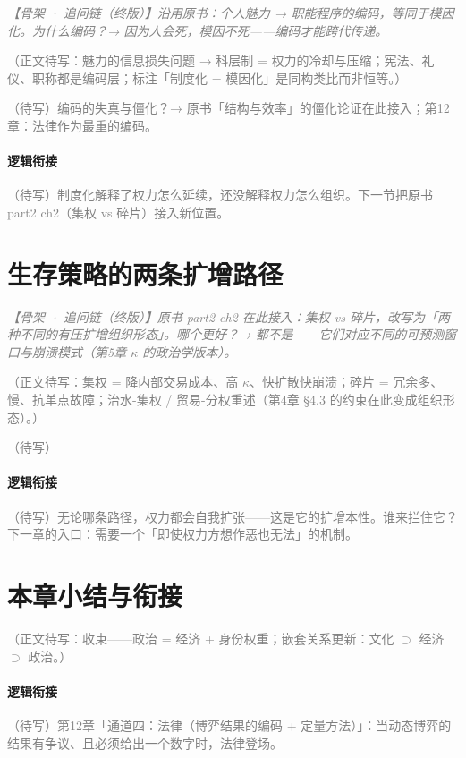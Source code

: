 \documentclass[../../main2.tex]{subfiles}
\begin{document}
	\textcolor{gray}{\textit{【骨架 · 追问链（终版）】沿用原书：个人魅力 → 职能程序的编码，等同于模因化。为什么编码？→ 因为人会死，模因不死——编码才能跨代传递。}}

	\textcolor{gray}{（正文待写：魅力的信息损失问题 → 科层制 = 权力的冷却与压缩；宪法、礼仪、职称都是编码层；\lowfreq 标注「制度化 = 模因化」是同构类比而非恒等。）}

	\begin{reader_anticipation}
		\item \textcolor{gray}{（待写）编码的失真与僵化？→ 原书「结构与效率」的僵化论证在此接入；第12章：法律作为最重的编码。}
	\end{reader_anticipation}

	\paragraph*{逻辑衔接}
	\textcolor{gray}{（待写）制度化解释了权力怎么延续，还没解释权力怎么组织。下一节把原书 part2 ch2（集权 vs 碎片）接入新位置。}

	\section{生存策略的两条扩增路径}
	\label{sec:pol-two-paths}

	\textcolor{gray}{\textit{【骨架 · 追问链（终版）】原书 part2 ch2 在此接入：集权 vs 碎片，改写为「两种不同的有压扩增组织形态」。哪个更好？→ 都不是——它们对应不同的可预测窗口与崩溃模式（第5章 $\kappa$ 的政治学版本）。}}

	\textcolor{gray}{（正文待写：集权 = 降内部交易成本、高 $\kappa$、快扩散快崩溃；碎片 = 冗余多、慢、抗单点故障；治水-集权 / 贸易-分权重述（第4章 §4.3 的约束在此变成组织形态）。）}

	\begin{readingnote}
		\textcolor{gray}{（待写）}
	\end{readingnote}

	\paragraph*{逻辑衔接}
	\textcolor{gray}{（待写）无论哪条路径，权力都会自我扩张——这是它的扩增本性。谁来拦住它？下一章的入口：需要一个「即使权力方想作恶也无法」的机制。}

	\section{本章小结与衔接}
	\label{sec:pol-summary}

	\textcolor{gray}{（正文待写：收束——政治 = 经济 + 身份权重；嵌套关系更新：文化 $\supset$ 经济 $\supset$ 政治。）}

	\paragraph*{逻辑衔接}
	\textcolor{gray}{（待写）第12章「通道四：法律（博弈结果的编码 + 定量方法）」：当动态博弈的结果有争议、且必须给出一个数字时，法律登场。}
\end{document}
